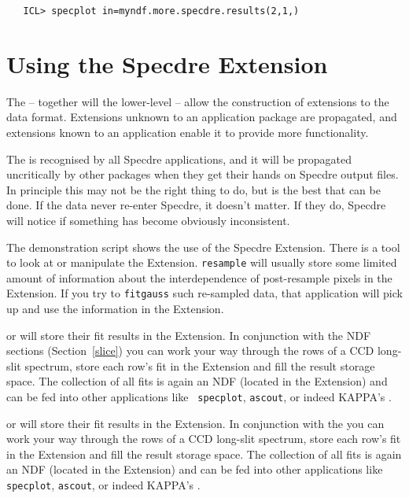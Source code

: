 \begin{verbatim}
   ICL> specplot in=myndf.more.specdre.results(2,1,)
\end{verbatim}


\section{\label{useext}Using the Specdre Extension}

   The
   -- together will the lower-level
   -- allow the construction of extensions to the data format.
   Extensions unknown to an application package are propagated, and
   extensions known to an application enable it to provide more
   functionality.

   The
   is recognised by all Specdre applications, and it will be propagated
   uncritically by other packages when they get their hands on Specdre
   output files. In principle this may not be the right thing to do, but
   is the best that can be done. If the data never re-enter Specdre, it
   doesn't matter. If they do, Specdre will notice if something has
   become obviously inconsistent.

   The demonstration script shows the use of the Specdre Extension.
   There is a tool
{\tt{}} to look at or manipulate the
   Extension. {\tt resample} will usually store some limited amount of
   information about the interdependence of post-resample pixels in the
   Extension. If you try to {\tt fitgauss} such re-sampled data, that
   application will pick up and use the information in the Extension.

\begin{latexonly}
{\tt{}}
   or
{\tt{}}
   will store their fit results in the Extension. In conjunction with
   the NDF sections
(Section~\ref{slice}) 
   you can work your way through the rows of a CCD long-slit spectrum,
   store each row's fit in the Extension and fill the result storage
   space. The collection of all fits is again an NDF (located in the
   Extension) and can be fed into other applications like {\tt
   specplot}, {\tt ascout}, or indeed KAPPA's
{\tt{}}.
\end{latexonly}
\begin{htmlonly}
{\tt{}}
   or
{\tt{}}
   will store their fit results in the Extension. In conjunction with
   the
   you can work your way through the rows of a CCD long-slit spectrum,
   store each row's fit in the Extension and fill the result storage
   space. The collection of all fits is again an NDF (located in the
   Extension) and can be fed into other applications like {\tt
   specplot}, {\tt ascout}, or indeed KAPPA's
{\tt{}}.
\end{htmlonly}

